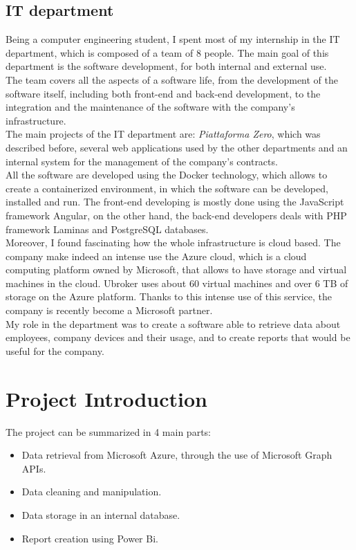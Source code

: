 \documentclass[12pt, a4paper, oneside]{article}
\begin{document}
\subsection{IT department}
Being a computer engineering student, I spent most of my internship in the IT department, which is composed of a team of 8 people. The main goal of this department is the software development, 
for both internal and external use.\\ 
The team covers all the aspects of a software life, from the development of the software itself, including both front-end and back-end development, to the integration and the maintenance of the software with the company's 
infrastructure.\\
The main projects of the IT department are: \emph{Piattaforma Zero}, which was described before, several web applications used by the other departments and an internal system for the management of the company's contracts.\\
All the software are developed using the Docker technology, which allows to create a containerized environment, in which the software can be developed, installed and run. The front-end developing is mostly done
using the JavaScript framework Angular, on the other hand, the back-end developers deals with PHP framework Laminas and PostgreSQL databases.\\
Moreover, I found fascinating how the whole infrastructure is cloud based. The company make indeed an intense use the Azure cloud, which is a cloud computing platform owned by Microsoft, that allows
to have storage and virtual machines in the cloud. Ubroker uses about 60 virtual machines and over 6 TB of storage on the Azure platform. Thanks to this intense use of this service, the company is recently
become a Microsoft partner.\\
My role in the department was to create a software able to retrieve data about employees, company devices and their usage, and to create reports that would be useful for the company.

\newpage
\section{Project Introduction}
The project can be summarized in 4 main parts:
\begin{itemize}
    \item Data retrieval from Microsoft Azure, through the use of Microsoft Graph APIs.
    \item Data cleaning and manipulation.
    \item Data storage in an internal database.
    \item Report creation using Power Bi.
\end{itemize}
\end{document}
